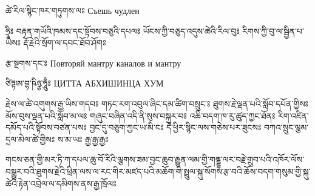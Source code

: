 ཚེ་རིལ་སྙིང་ཁར་གཏུགས་ལཿ 
Съешь чудлен

ཧྲཱིཿ བརྟན་གཡོའི་ཁམས་དང་སྟོབས་བཅུའི་དཔལཿ 
ཡོངས་ཀྱི་བཅུད་འདུས་ཚེའི་རིལ་བུཿ 
རིགས་ཀྱི་བུ་ལ་སྦྱིན་པ་ཡིསཿ 
རྡོ་རྗེའི་སྲོག་ལ་དབང་ཐོབ་ཤོགཿ 

རྩ་སྔགས་དང་ཿ 
Повторяй мантру каналов и мантру

ཙིཏྟཨ་བྷ་ཥིཉྩ་ཧཱུྃཿ 
ЦИТТА АБХИШИНЦА ХУМ

རྗེས་ལ་ཚེ་འགུགས་རྒྱ་ཡིས་གདབཿ གཏང་རག་འབུལ་ཞིང་དམ་ཚིག་བསྲུང་ཿ ཐུགས་རྗེ་ལྡན་པའི་སློབ་དཔོན་གྱིསཿ མོས་བུས་ལྡན་པའི་སློབ་མ་ལཿ གཞུང་བཞིན་འདི་ནི་སུས་བསྐུར་བཿ འཆི་བདག་ཁ་རུ་ཚུད་ཀྱང་ཐོནཿ རིག་འཛིན་དམོད་པའི་སྟོབས་བཙན་པསཿ བྱང་དུ་བཅུག་ཀྱང་ཡ་མི་ངཿ དེ་ཕྱིར་སྙིང་ལས་གཅེས་པར་ཟུངསཿ བཀའ་སྲུང་ལྕམ་དྲལ་མེལ་ཚེ་གྱིསཿ ས་མ་ཡཿ རྒྱ་རྒྱ་རྒྱཿ 

གངས་ཅན་གྱི་མར་ཏི་ཀ་དཔལ་ཆུ་བོ་རིའི་ལྕགས་ཟམ་བྱང་ཆུབ་རྒྱུན་ལམ་གྱི་གནྡྷ་ལར་བརྗེ་གྲུབ་པའི་འཁོར་ལོས་བསྒྱུར་བའི་ཐུགས་རྗེའི་ཕྲིན་ལས་ལ་རང་གིར་མཛད་པའི་མཆོག་གི་སྤྲུལ་སྐུ་སོགས་རྩ་བའི་ཆོས་བདག་གསུམ་གྱི་སྐུ་ཚེའི་རྟེན་འབྲེལ་ལ་དམིགས་ནས་རྒྱ་ཁྲོལཿ


